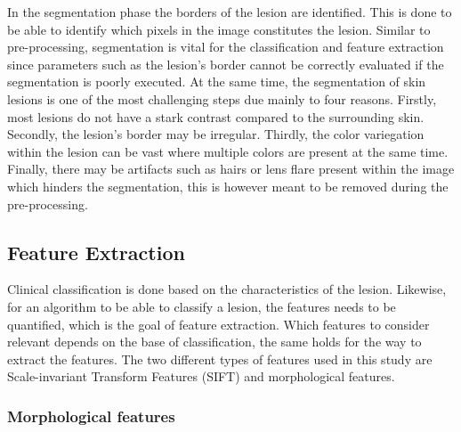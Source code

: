 \documentclass{kththesis}
\begin{document}
In the segmentation phase the borders of the lesion are identified. This is done to be able to identify which pixels in the image constitutes the lesion. Similar to pre-processing, segmentation is vital for the classification and feature extraction since parameters such as the lesion’s border cannot be correctly evaluated if the segmentation is poorly executed. At the same time, the segmentation of skin lesions is one of the most challenging steps due mainly to four reasons. Firstly, most lesions do not have a stark contrast compared to the surrounding skin. Secondly, the lesion’s border may be irregular. Thirdly, the color variegation %
within the lesion can be vast where multiple colors are present at the same time. Finally, there may be artifacts such as hairs or lens flare present within the image which hinders the segmentation, this is however meant to be removed during the pre-processing. \parencite{jaworek2016automatic}

\subsection{Feature Extraction}

Clinical classification is done based on the characteristics of the lesion. Likewise, for an algorithm to be able to classify a lesion, the features needs to be quantified, which is the goal of feature extraction. Which features to consider relevant depends on the base of classification, the same holds for the way to extract the features. The two different types of features used in this study are Scale-invariant Transform Features (SIFT) and morphological features.

\subsubsection{Morphological features}
\end{document}
